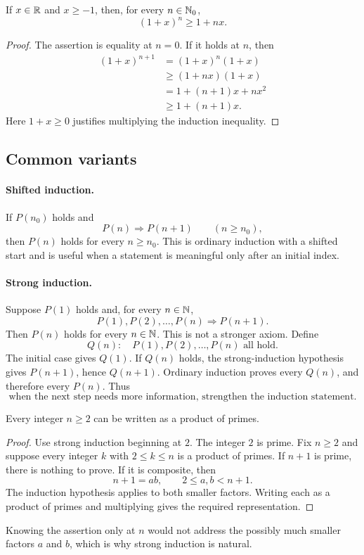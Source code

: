 \begin{proposition}
If \(x\in\mathbb{R}\) and \(x\geq-1\), then, for every \(n\in\mathbb{N}_0\),
\[
(1+x)^n\geq1+nx.
\]
\end{proposition}
\begin{proof}
The assertion is equality at \(n=0\). If it holds at \(n\), then
\begin{align*}
(1+x)^{n+1}
&=(1+x)^n(1+x)\\
&\geq(1+nx)(1+x)\\
&=1+(n+1)x+nx^2\\
&\geq1+(n+1)x.
\end{align*}
Here \(1+x\geq0\) justifies multiplying the induction inequality.
\end{proof}

\subsection*{Common variants}
\paragraph{Shifted induction.}
If \(P(n_0)\) holds and
\[
P(n)\Longrightarrow P(n+1)\qquad(n\geq n_0),
\]
then \(P(n)\) holds for every \(n\geq n_0\). This is ordinary induction
with a shifted start and is useful when a statement is meaningful only after
an initial index.

\paragraph{Strong induction.}
Suppose \(P(1)\) holds and, for every \(n\in\mathbb{N}\),
\[
P(1),P(2),\ldots,P(n)\Longrightarrow P(n+1).
\]
Then \(P(n)\) holds for every \(n\in\mathbb{N}\). This is not a stronger axiom.
Define
\[
Q(n):\quad P(1),P(2),\ldots,P(n)\text{ all hold}.
\]
The initial case gives \(Q(1)\). If \(Q(n)\) holds, the strong-induction
hypothesis gives \(P(n+1)\), hence \(Q(n+1)\). Ordinary induction proves
every \(Q(n)\), and therefore every \(P(n)\). Thus
\[
\boxed{\text{when the next step needs more information, strengthen the induction statement}.}
\]

\begin{theorem}
Every integer \(n\geq2\) can be written as a product of primes.
\end{theorem}
\begin{proof}
Use strong induction beginning at \(2\). The integer \(2\) is prime. Fix
\(n\geq2\) and suppose every integer \(k\) with \(2\leq k\leq n\) is a
product of primes. If \(n+1\) is prime, there is nothing to prove. If it is
composite, then
\[
n+1=ab,
\qquad
2\leq a,b<n+1.
\]
The induction hypothesis applies to both smaller factors. Writing each as a
product of primes and multiplying gives the required representation.
\end{proof}
Knowing the assertion only at \(n\) would not address the possibly much
smaller factors \(a\) and \(b\), which is why strong induction is natural.


